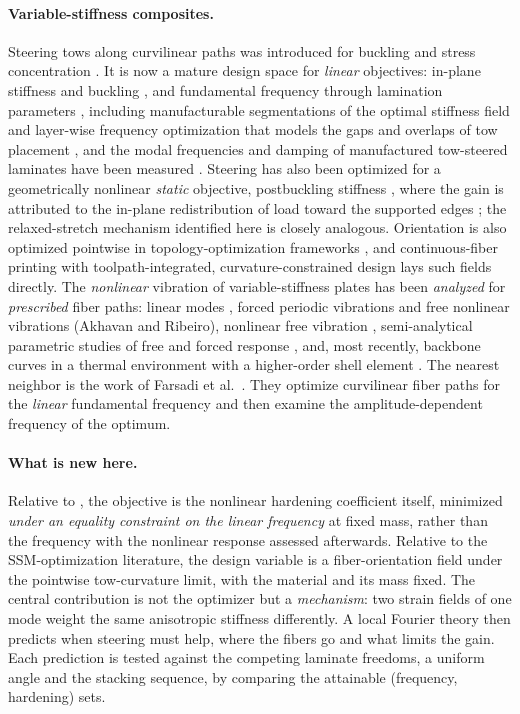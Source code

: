 \paragraph{Variable-stiffness composites.} Steering tows along curvilinear paths was
introduced for buckling and stress concentration \cite{hyer1991}. It is now a mature design
space for \emph{linear} objectives: in-plane stiffness and buckling
\cite{gurdal,lopes2008,ijsselmuiden}, and fundamental frequency through lamination
parameters \cite{abdalla2007,tsai1968}, including manufacturable segmentations of the
optimal stiffness field \cite{sheikhi2024} and layer-wise frequency optimization that
models the gaps and overlaps of tow placement \cite{pagani2025,fayazbakhsh2013}, and the modal
frequencies and damping of manufactured tow-steered laminates have been measured \cite{pereira2020}. Steering has
also been optimized for a geometrically nonlinear \emph{static} objective, postbuckling stiffness
\cite{wu2013,raju2018}, where the gain is attributed to the in-plane redistribution of load
toward the supported edges \cite{gurdal,wu2013}; the relaxed-stretch mechanism identified
here is closely analogous. Orientation is also optimized pointwise in topology-optimization
frameworks \cite{stegmann2005,nomura2015}, and continuous-fiber printing \cite{matsuzaki2016}
with toolpath-integrated, curvature-constrained design \cite{wong2026} lays such fields
directly. The \emph{nonlinear} vibration of variable-stiffness plates has been
\emph{analyzed} for \emph{prescribed} fiber paths: linear modes \cite{akhavan2011}, forced
periodic vibrations \cite{akhavan2015,akhavan2017} and free nonlinear vibrations
\cite{ribeiro2012,ribeiroakhavan2012} (Akhavan and Ribeiro), nonlinear free vibration
\cite{houmat2013}, semi-analytical parametric studies of free and forced response
\cite{yan2021}, and, most recently, backbone curves in a thermal environment with a
higher-order shell element \cite{zhao2026}. The nearest neighbor is the work of Farsadi et
al.\ \cite{farsadi2021,farsadi2025}. They optimize curvilinear fiber paths for the
\emph{linear} fundamental frequency and then examine the amplitude-dependent frequency of the
optimum.

\paragraph{What is new here.} Relative to \cite{farsadi2021,farsadi2025}, the objective is
the nonlinear hardening coefficient itself, minimized \emph{under an equality constraint on
the linear frequency} at fixed mass, rather than the frequency with the nonlinear response
assessed afterwards. Relative to the SSM-optimization literature, the design variable is a
fiber-orientation field under the pointwise tow-curvature limit, with the material and its
mass fixed. The central contribution is not the optimizer but a \emph{mechanism}: two
strain fields of one mode weight the same anisotropic stiffness differently. A local Fourier
theory then predicts when steering must help, where the fibers go and what limits the gain.
Each prediction is tested against the competing laminate freedoms, a uniform angle and the
stacking sequence, by comparing the attainable (frequency, hardening) sets.

